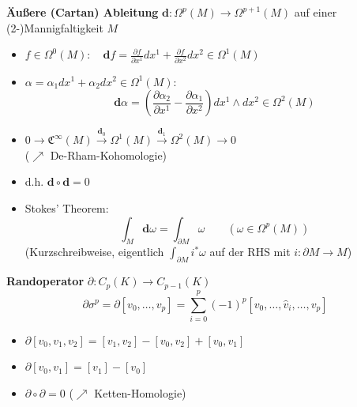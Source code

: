 \documentclass{beamer}
\renewcommand{\d}{\textbf{d}}
\newcommand{\ablx}[2]{\frac{\partial #1}{\partial x^{#2}}}
\begin{document}
  \begin{frame}
    \begin{block}{\textbf{Äußere (Cartan) Ableitung} \( \d: \Omega^{p}(M) \longrightarrow \Omega^{p+1}(M) \) auf einer (2-)Mannigfaltigkeit \( M \)}
      \begin{itemize}
        \item<2-> \( f \in \Omega^{0}(M):\quad \d f = \ablx{f}{1}dx^{1} + \ablx{f}{2}dx^{2} \in  \Omega^{1}(M)\)
        \item<3-> \( \alpha = \alpha_{1}dx^{1} + \alpha_{2}dx^{2} \in \Omega^{1}(M):\) 
                \[\d\alpha = \left( \ablx{\alpha_{2}}{1} - \ablx{\alpha_{1}}{2} \right) dx^{1} \wedge dx^{2} \in \Omega^{2}(M)\]
        \item<4-> \( 0 \rightarrow \mathfrak{C}^{\infty}(M) \overset{\d_{0}}{\rightarrow} \Omega^{1}(M) \overset{\d_{1}}{\rightarrow} \Omega^{2}(M) \rightarrow 0\) \\
              (\( \nearrow \) De-Rham-Kohomologie)
        \item<4-> d.h. \( \d\circ\d = 0 \)
        \item<5-> Stokes' Theorem: 
            \[ \int_{M}\d\omega = \int_{\partial M} \omega \qquad (\omega\in\Omega^{p}(M))\]
            (Kurzschreibweise, eigentlich \( \int_{\partial M} i^{*}\omega \) auf der RHS mit \( i: \partial M \rightarrow M \))
      \end{itemize}
    \end{block}
  \end{frame}

  \begin{frame}
    \begin{block}{\textbf{Randoperator} \( \partial:C_{p}(K) \longrightarrow C_{p-1}(K) \)}
      \[ \partial\sigma^{p} = \partial\left[ v_{0}, \ldots, v_{p} \right] = \sum_{i=0}^{p} (-1)^{p} \left[ v_{0}, \ldots, \hat{v}_{i}, \ldots,  v_{p} \right]\]
      \begin{itemize}
        \item \( \partial\left[ v_{0}, v_{1}, v_{2} \right] = \left[ v_{1}, v_{2} \right] - \left[ v_{0}, v_{2} \right] + \left[ v_{0}, v_{1} \right]\)
        \item \( \partial\left[ v_{0}, v_{1} \right] = \left[ v_{1} \right] - \left[ v_{0} \right]\)
        \item \( \partial\circ\partial = 0 \) \qquad(\( \nearrow \) Ketten-Homologie)
      \end{itemize}
    \end{block}
  \end{frame}
\end{document}
